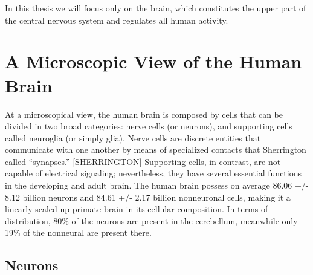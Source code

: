 In this thesis we will focus only on the brain, which constitutes the upper part of the central nervous system and regulates all human activity.

\section{A Microscopic View of the Human Brain}
\cite{Waehnert2014}

At a microscopical view, the human brain is composed by cells that can be divided in two broad categories: nerve cells (or neurons), and supporting cells called neuroglia (or simply glia).
Nerve cells are discrete entities that communicate with one another by means of specialized contacts that Sherrington called “synapses.” [SHERRINGTON]
Supporting cells, in contrast, are not capable of electrical signaling; nevertheless, they have several essential functions in the developing and adult brain.
The human brain possess on average 86.06 +/- 8.12 billion neurons and 84.61 +/- 2.17 billion nonneuronal cells, making it a linearly scaled-up primate brain in its cellular composition.
In terms of distribution, 80\% of the neurons are present in the cerebellum, meanwhile only 19\% of the nonneural are present there.

\subsection{Neurons}

